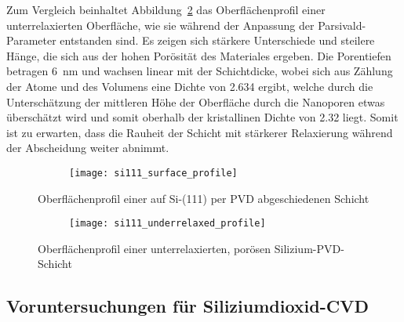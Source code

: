 Zum Vergleich beinhaltet Abbildung~\ref{fig:siliconunderrelaxedprofile} das Oberflächenprofil einer unterrelaxierten Oberfläche, wie sie während der Anpassung der Parsivald-Parameter entstanden sind.
Es zeigen sich stärkere Unterschiede und steilere Hänge, die sich aus der hohen Porösität des Materiales ergeben.
Die Porentiefen betragen \SI{6}{\nano\meter} und wachsen linear mit der Schichtdicke, wobei sich aus Zählung der Atome und des Volumens eine Dichte von \SI{2.634}{\gpcc} ergibt, welche durch die Unterschätzung der mittleren Höhe der Oberfläche durch die Nanoporen etwas überschätzt wird und somit oberhalb der kristallinen Dichte von \SI{2.32}{\gpcc} liegt.
Somit ist zu erwarten, dass die Rauheit der Schicht mit stärkerer Relaxierung während der Abscheidung weiter abnimmt.

\begin{figure}[H]
  \centering
  \captionsetup[subfigure]{singlelinecheck=false}
  \begin{subfigure}[t]{7.1cm}
    \texttt{[image: si111\_surface\_profile]}
  \end{subfigure}
  \begin{subfigure}[t]{1.7cm}
    \def\svgwidth{\textwidth}
    
  \end{subfigure}
  \caption[Oberflächenprofil einer Silizium-PVD-Schicht]{
    Oberflächenprofil einer auf Si-(111) per PVD abgeschiedenen Schicht
  }
  \label{fig:siliconprofile}
\end{figure}

\begin{figure}[H]
  \centering
  \captionsetup[subfigure]{singlelinecheck=false}
  \begin{subfigure}[t]{7.1cm}
    \texttt{[image: si111\_underrelaxed\_profile]}
  \end{subfigure}
  \begin{subfigure}[t]{1.7cm}
    \def\svgwidth{\textwidth}
    
  \end{subfigure}
  \caption[Oberflächenprofil einer unterrelaxierten Siliziumschicht]{
    Oberflächenprofil einer unterrelaxierten, porösen Silizium-PVD-Schicht
  }
  \label{fig:siliconunderrelaxedprofile}
\end{figure}

\subsection{Voruntersuchungen für Siliziumdioxid-CVD}

